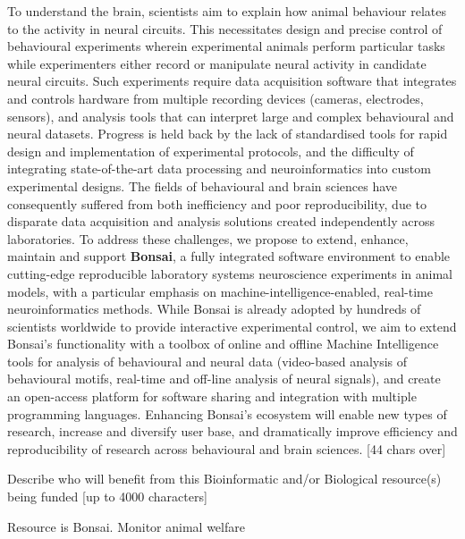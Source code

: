 To understand the brain, scientists aim to explain how animal behaviour relates to the activity in neural circuits. This necessitates design and precise control of behavioural experiments wherein experimental animals perform particular tasks while experimenters either record or manipulate neural activity in candidate neural circuits. Such experiments require data acquisition software that integrates and controls hardware from multiple recording devices (cameras, electrodes, sensors), and analysis tools that can interpret large and complex behavioural and neural datasets. Progress is held back by the lack of standardised tools for rapid design and implementation of experimental protocols, and the difficulty of integrating state-of-the-art data processing and neuroinformatics into custom experimental designs. The fields of behavioural and brain sciences have consequently suffered from both inefficiency and poor reproducibility, due to disparate data acquisition and analysis solutions created independently across laboratories.   
To address these challenges, we propose  to  extend,  enhance,  maintain  and  support \textbf{Bonsai},  a  fully  integrated  software  environment  to enable cutting-edge reproducible laboratory systems neuroscience experiments in animal models, with a particular emphasis on machine-intelligence-enabled, real-time neuroinformatics methods. While Bonsai is already adopted by hundreds of scientists worldwide to provide interactive experimental control, we aim to extend Bonsai’s functionality with a toolbox of online and offline Machine Intelligence tools for analysis of behavioural and neural data (video-based analysis of behavioural motifs, real-time and off-line analysis of neural signals), and create an open-access platform for software sharing and integration with multiple programming languages. Enhancing Bonsai's ecosystem will enable new types of research, increase and diversify user base, and dramatically improve efficiency and reproducibility of research across behavioural and brain sciences.
[44 chars over]


Describe who will benefit from this Bioinformatic and/or Biological resource(s) being funded [up to 4000 characters]

Resource is Bonsai.
Monitor animal welfare


